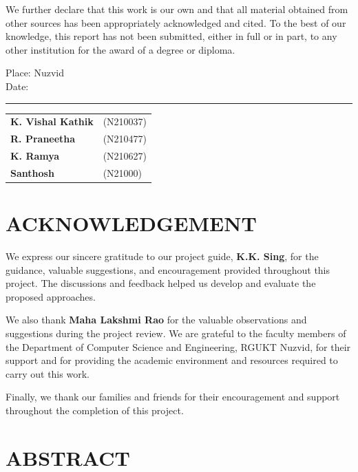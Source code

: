 \documentclass[12pt,a4paper]{report}
\newcommand{\Department}{Department of Computer Science and Engineering}
\newcommand{\GuideName}{K.K. Sing}
\newcommand{\PanelName}{Maha Lakshmi Rao}
\begin{document}
We further declare that this work is our own and that all material
obtained from other sources has been appropriately acknowledged and cited.
To the best of our knowledge, this report has not been submitted, either
in full or in part, to any other institution for the award of a degree
or diploma.

\vspace{1cm}
\noindent Place: Nuzvid\\
Date: \rule{3cm}{0.4pt}

\vspace{1cm}
\begin{flushright}
\begin{tabular}{ll}
\textbf{K. Vishal Kathik} & (N210037)\\[0.2cm]
\textbf{R. Praneetha} & (N210477)\\[0.2cm]
\textbf{K. Ramya} & (N210627)\\[0.2cm]
\textbf{Santhosh} & (N21000)
\end{tabular}
\end{flushright}

\clearpage
\chapter*{ACKNOWLEDGEMENT}

We express our sincere gratitude to our project guide,
\textbf{\GuideName}, for the guidance, valuable suggestions, and
encouragement provided throughout this project. The discussions and
feedback helped us develop and evaluate the proposed approaches.

We also thank \textbf{\PanelName} for the valuable observations and
suggestions during the project review. We are grateful to the faculty
members of the \Department, RGUKT Nuzvid, for their support and for
providing the academic environment and resources required to carry out
this work.

Finally, we thank our families and friends for their encouragement and
support throughout the completion of this project.

\clearpage
\chapter*{ABSTRACT}
\end{document}
